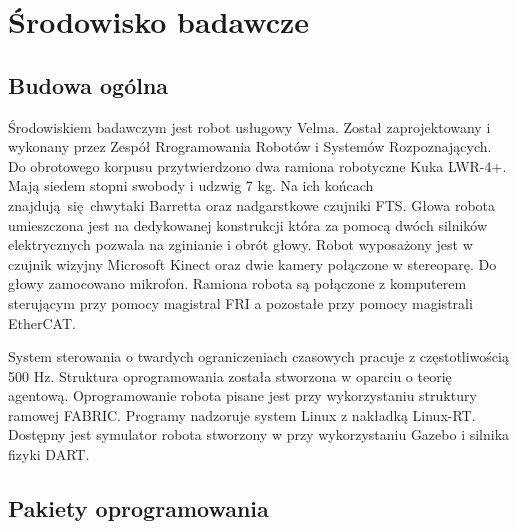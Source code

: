 
\chapter{Środowisko badawcze\label{chap:srodowisko}}
	\section{Budowa ogólna}
	Środowiskiem badawczym jest robot usługowy Velma. Został zaprojektowany i wykonany przez Zespół Rrogramowania Robotów i Systemów Rozpoznających. Do obrotowego korpusu przytwierdzono dwa ramiona robotyczne Kuka LWR-4+. Mają siedem stopni swobody i udzwig 7 kg. Na ich końcach znajdują się chwytaki Barretta oraz nadgarstkowe czujniki FTS. Głowa robota umieszczona jest na dedykowanej konstrukcji która za pomocą dwóch silników elektrycznych pozwala na zginianie i obrót głowy. Robot wyposażony jest w czujnik wizyjny Microsoft Kinect oraz dwie kamery połączone w stereoparę. Do głowy zamocowano mikrofon. Ramiona robota są połączone z komputerem sterującym przy pomocy magistral FRI a pozostałe przy pomocy magistrali EtherCAT. 
	
	System sterowania o twardych ograniczeniach czasowych pracuje z częstotliwością 500 Hz. Struktura oprogramowania została stworzona w oparciu o teorię agentową. Oprogramowanie robota pisane jest przy wykorzystaniu struktury ramowej FABRIC. Programy nadzoruje system Linux z nakładką Linux-RT. Dostępny jest symulator robota stworzony w przy wykorzystaniu Gazebo i silnika fizyki DART. 
	

	\section{Pakiety oprogramowania}
